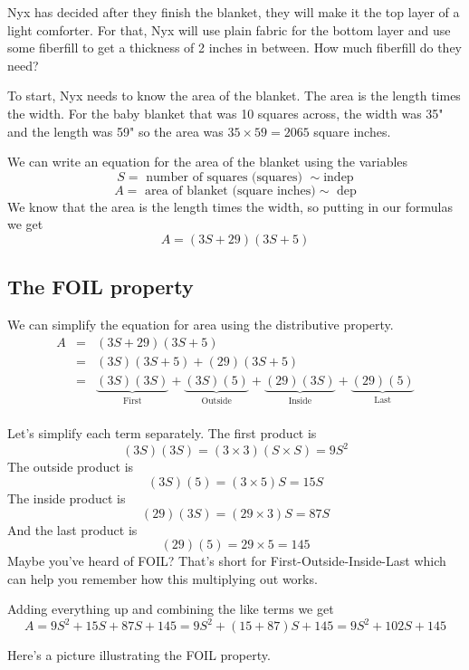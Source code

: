 Nyx has decided after they finish the blanket, they will make it the top layer of a light comforter.  For that, Nyx will use plain fabric for the bottom layer and use some fiberfill to get a thickness of 2 inches in between. How much fiberfill do they need? 

To start, Nyx needs to know the area of the blanket. The area is the length times the width.  For the baby blanket that was 10 squares across, the width was 35" and the length was 59" so the area was $35 \times 59 = 2065$ square inches.  

We can write an equation for the area of the blanket using the variables
$$S = \text{ number of squares (squares) } \sim \text{indep}$$
$$A = \text{ area of blanket (square inches)} \sim \text{ dep}$$
We know that the area is the length times the width, so putting in our formulas we get 
$$A = (3S+29)(3S+5)$$

\subsection*{The FOIL property}

We can simplify the equation for area using the distributive property.  
\begin{eqnarray}
    A &=& (3S+29)(3S+5) \\
    &=& (3S)(3S+5) + (29)(3S+5) \\
    &=& \underbrace{(3S)(3S)}_{\text{First}} + \underbrace{(3S)(5)}_{\text{Outside}}  + \underbrace{(29)(3S)}_{\text{Inside}} + \underbrace{(29)(5)}_{\text{Last}} \\
\end{eqnarray}

Let's simplify each term separately.  The first product is 
$$(3S)(3S) = (3 \times 3)(S \times S) = 9S^2$$
The outside product is 
$$(3S)(5) = (3 \times 5)S = 15S$$
The inside product is 
$$(29)(3S) = (29 \times 3)S = 87S$$
And the last product is
$$(29)(5) = 29 \times 5 = 145$$
Maybe you've heard of FOIL?  That's short for First-Outside-Inside-Last which can help you remember how this multiplying out works.

Adding everything up and combining the like terms we get
$$A = 9S^2 + 15S + 87S + 145 = 9S^2 + (15+87)S + 145 = 9S^2+102S + 145$$

Here's a picture illustrating the FOIL property.

